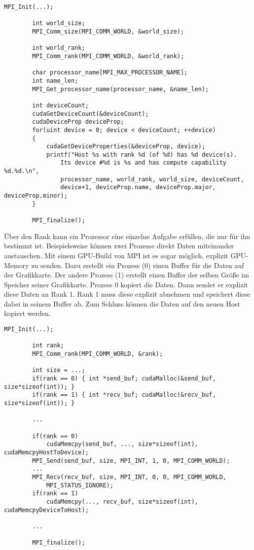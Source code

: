 		\newpage
		
		\begin{lstlisting}[caption=Device Abfrage mit MPI]
		MPI_Init(...);
   
		int world_size;
		MPI_Comm_size(MPI_COMM_WORLD, &world_size);

		int world_rank;
		MPI_Comm_rank(MPI_COMM_WORLD, &world_rank);

		char processor_name[MPI_MAX_PROCESSOR_NAME];
		int name_len;
		MPI_Get_processor_name(processor_name, &name_len);

		int deviceCount;
		cudaGetDeviceCount(&deviceCount);
		cudaDeviceProp deviceProp;
		for(uint device = 0; device < deviceCount; ++device)
		{
			cudaGetDeviceProperties(&deviceProp, device);
			printf("Host %s with rank %d (of %d) has %d device(s). 
				Its device #%d is %s and has compute capability %d.%d.\n", 
				processor_name, world_rank, world_size, deviceCount, 
				device+1, deviceProp.name, deviceProp.major, deviceProp.minor);
		}
    
		MPI_finalize();
	    \end{lstlisting}
    
    	Über den Rank kann ein Prozessor eine einzelne Aufgabe erfüllen, die nur für ihn bestimmt ist. Beispielsweise können zwei Prozesse direkt Daten miteinander austauschen. Mit einem GPU-Build von MPI ist es sogar möglich, explizit GPU-Memory zu senden. Dazu erstellt ein Prozess (0) einen Buffer für die Daten auf der Grafikkarte. Der andere Prozess (1) erstellt einen Buffer der selben Größe im Speicher seiner Grafikkarte. Prozess 0 kopiert die Daten. Dann sendet er explizit diese Daten an Rank 1. Rank 1 muss diese explizit abnehmen und speichert diese dabei in seinem Buffer ab. Zum Schluss können die Daten auf den neuen Host kopiert werden.
    	
    	\newpage
    	
	    \begin{lstlisting}[caption=Austausch von Device Memory mit MPI] 
    	MPI_Init(...);
    
    	int rank;   
	    MPI_Comm_rank(MPI_COMM_WORLD, &rank);
    
    	int size = ...;
	    if(rank == 0) { int *send_buf; cudaMalloc(&send_buf, size*sizeof(int)); }
    	if(rank == 1) { int *recv_buf; cudaMalloc(&recv_buf, size*sizeof(int)); }
    
    	...
    
    	if(rank == 0) 
    		cudaMemcpy(send_buf, ..., size*sizeof(int), cudaMemcpyHostToDevice);   
	    MPI_Send(send_buf, size, MPI_INT, 1, 0, MPI_COMM_WORLD);
	    ...
    	MPI_Recv(recv_buf, size, MPI_INT, 0, 0, MPI_COMM_WORLD, 
    		MPI_STATUS_IGNORE);
    	if(rank == 1) 
    		cudaMemcpy(..., recv_buf, size*sizeof(int), cudaMemcpyDeviceToHost);
    		
    	...
    
	    MPI_finalize();
    	\end{lstlisting}
    	
